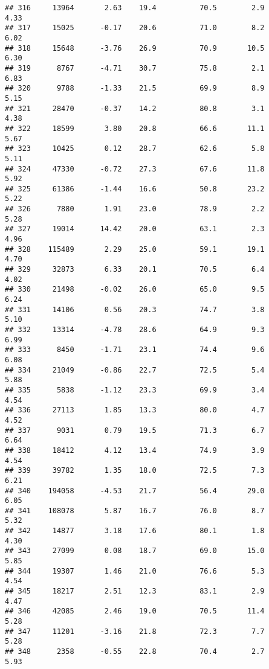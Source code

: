 \documentclass[
]{article}
\begin{document}
\begin{verbatim}
## 316     13964       2.63    19.4          70.5        2.9              4.33
## 317     15025      -0.17    20.6          71.0        8.2              6.02
## 318     15648      -3.76    26.9          70.9       10.5              6.30
## 319      8767      -4.71    30.7          75.8        2.1              6.83
## 320      9788      -1.33    21.5          69.9        8.9              5.15
## 321     28470      -0.37    14.2          80.8        3.1              4.38
## 322     18599       3.80    20.8          66.6       11.1              5.67
## 323     10425       0.12    28.7          62.6        5.8              5.11
## 324     47330      -0.72    27.3          67.6       11.8              5.92
## 325     61386      -1.44    16.6          50.8       23.2              5.22
## 326      7880       1.91    23.0          78.9        2.2              5.28
## 327     19014      14.42    20.0          63.1        2.3              4.96
## 328    115489       2.29    25.0          59.1       19.1              4.70
## 329     32873       6.33    20.1          70.5        6.4              4.02
## 330     21498      -0.02    26.0          65.0        9.5              6.24
## 331     14106       0.56    20.3          74.7        3.8              5.10
## 332     13314      -4.78    28.6          64.9        9.3              6.99
## 333      8450      -1.71    23.1          74.4        9.6              6.08
## 334     21049      -0.86    22.7          72.5        5.4              5.88
## 335      5838      -1.12    23.3          69.9        3.4              4.54
## 336     27113       1.85    13.3          80.0        4.7              4.52
## 337      9031       0.79    19.5          71.3        6.7              6.64
## 338     18412       4.12    13.4          74.9        3.9              4.54
## 339     39782       1.35    18.0          72.5        7.3              6.21
## 340    194058      -4.53    21.7          56.4       29.0              6.05
## 341    108078       5.87    16.7          76.0        8.7              5.32
## 342     14877       3.18    17.6          80.1        1.8              4.30
## 343     27099       0.08    18.7          69.0       15.0              5.85
## 344     19307       1.46    21.0          76.6        5.3              4.54
## 345     18217       2.51    12.3          83.1        2.9              4.47
## 346     42085       2.46    19.0          70.5       11.4              5.28
## 347     11201      -3.16    21.8          72.3        7.7              5.28
## 348      2358      -0.55    22.8          70.4        2.7              5.93

\end{verbatim}
\end{document}
